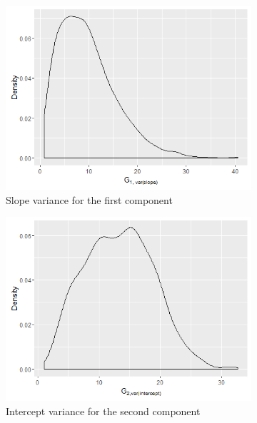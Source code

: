 \begin{figure}[!htb]
\begin{subfigure}[b]{0.4\textwidth}
		\includegraphics[width=\textwidth]{mainmatter/chapter_6_blood_donor/G22_1.png}	
          \caption{\label{fig : cov_blood_donor_22_1}Slope variance for the first component}
	\end{subfigure}	
	\begin{subfigure}[b]{0.4\textwidth}
		\includegraphics[width=\textwidth]{mainmatter/chapter_6_blood_donor/G11_2.png}
        \caption{\label{fig : cov_blood_donor_11_2} Intercept variance for the second component}
	\end{subfigure}
	\begin{subfigure}[b]{0.4\textwidth}

\end{subfigure}
\end{figure}
